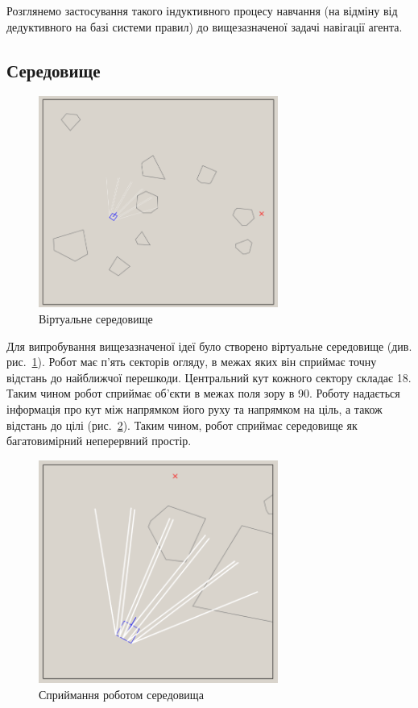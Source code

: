 \documentclass[a4paper,10pt,fleqn]{article}
\begin{document}
Розглянемо застосування такого індуктивного процесу навчання (на відміну від дедуктивного на базі системи правил) до вищезазначеної задачі навігації агента.

\subsection{Середовище}

\begin{figure}
	\centering
    \includegraphics[width=0.7\textwidth]{env_screen.png}
	\caption{Віртуальне середовище}
	\label{fig:environment}
\end{figure}

Для випробування вищезазначеної ідеї було створено віртуальне середовище (див. рис.~\ref{fig:environment}). Робот має п'ять секторів огляду, в межах яких він сприймає точну відстань до найближчої перешкоди. Центральний кут кожного сектору складає 18\textdegree. Таким чином робот сприймає об'єкти в межах поля зору в 90\textdegree. Роботу надається інформація про кут між напрямком його руху та напрямком на ціль, а також відстань до цілі (рис.~\ref{fig:perception}). Таким чином, робот сприймає середовище як багатовимірний неперервний простір.

\begin{figure}
	\centering
    \includegraphics[width=0.7\textwidth]{perception.png}
	\caption{Сприймання роботом середовища}
	\label{fig:perception}
\end{figure}
\end{document}
